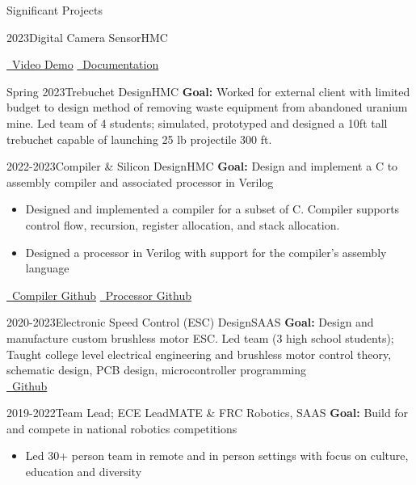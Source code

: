 \documentclass[]{mcdowellcv}
\begin{document}
\begin{cvsection}{Significant Projects}
\begin{cvsubsection}{2023}{Digital Camera Sensor}{HMC}
\begin{itemize}
		\end{itemize}
		\href{https://www.youtube.com/shorts/lJYW2ZMiyLE}{\faYoutube \ Video Demo}
		\href{https://kavidey.github.io/NeoObscura/}{\faBook \ Documentation}
	\end{cvsubsection}
	\begin{cvsubsection}{Spring 2023}{\hypertarget{trebuchet_design}{Trebuchet Design}}{HMC}
		\textbf{Goal:} Worked for external client with limited budget to design method of removing waste equipment from abandoned uranium mine. Led team of 4 students; simulated, prototyped and designed a 10ft tall trebuchet capable of launching 25 lb projectile 300 ft.
	\end{cvsubsection}
	\begin{cvsubsection}{2022-2023}{Compiler \& Silicon Design}{HMC}
		\textbf{Goal:} Design and implement a C to assembly compiler and associated processor in Verilog
		\begin{itemize}
			\item Designed and implemented a compiler for a subset of C. Compiler supports control flow, recursion, register allocation, and stack allocation.
			\item Designed a processor in Verilog with support for the compiler's assembly language
		\end{itemize}
		\href{https://github.com/kavidey/HMMM-Compiler/}{\faGithub \ Compiler Github}
		\href{https://github.com/kavidey/Hmmm-Silicon/tree/main/verilog/rtl/hmmm/}{\faGithub \ Processor Github}
	\end{cvsubsection}
	\begin{cvsubsection}{2020-2023}{Electronic Speed Control (ESC) Design}{SAAS}
		\textbf{Goal:} Design and manufacture custom brushless motor ESC. Led team (3 high school students); Taught college level electrical engineering and brushless motor control theory, schematic design, PCB design, microcontroller programming
		\\
		\href{https://github.com/redshiftrobotics/blueshift-esc}{\faGithub \ Github}
	\end{cvsubsection}
	\begin{cvsubsection}{2019-2022}{Team Lead; ECE Lead}{MATE \& FRC Robotics, SAAS}
		\textbf{Goal:} Build for and compete in national robotics competitions
		\begin{itemize}
			\item Led 30+ person team in remote and in person settings with focus on culture, education and diversity

\end{itemize}
\end{cvsubsection}
\end{cvsection}
\end{document}

